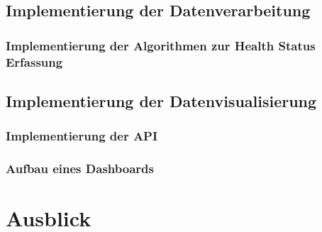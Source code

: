 \section{Implementierung der Datenverarbeitung}
\subsection{Implementierung der Algorithmen zur Health Status Erfassung}

\section{Implementierung der Datenvisualisierung}
\subsection{Implementierung der API}
\subsection{Aufbau eines Dashboards}


\chapter{Ausblick}